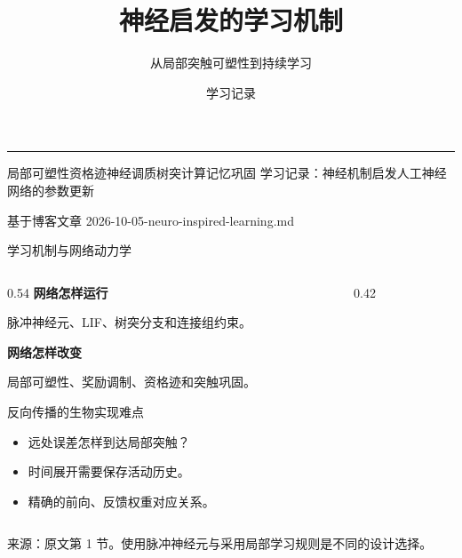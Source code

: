 \documentclass[UTF8,aspectratio=169,10pt,fontset=fandol]{ctexbeamer}
\title{神经启发的学习机制}
\subtitle{从局部突触可塑性到持续学习}
\author{学习记录}
\date{}
\newcommand{\source}[1]{\par\vfill{\tiny\color{Muted}来源：#1}}
\begin{document}
\begin{frame}[plain]
  \vspace{0.8cm}
  {\color{Coral}\rule{1.1cm}{3pt}}\par
  {\inserttitle\par}
  \vspace{0.4cm}
  {\large\insertsubtitle\par}
  \vspace{1cm}
  {\color{Blue}局部可塑性\quad 资格迹\quad 神经调质\quad 树突计算\quad 记忆巩固}
  \vfill
  {\small 学习记录：神经机制启发人工神经网络的参数更新}\par
  {\scriptsize\color{Muted}基于博客文章 2026-10-05-neuro-inspired-learning.md}
\end{frame}

\begin{frame}{学习机制与网络动力学}
  \begin{columns}[T,onlytextwidth]
    \begin{column}{0.54\textwidth}
      \textbf{网络怎样运行}\par
      脉冲神经元、LIF、树突分支和连接组约束。
      \medskip

      \textbf{网络怎样改变}\par
      局部可塑性、奖励调制、资格迹和突触巩固。
      \medskip

      \alert{反向传播的生物实现难点}
      \begin{itemize}
        \item 远处误差怎样到达局部突触？
        \item 时间展开需要保存活动历史。
        \item 精确的前向、反馈权重对应关系。
      \end{itemize}
    \end{column}
    \begin{column}{0.42\textwidth}
      \centering
    \end{column}
  \end{columns}
  \source{原文第 1 节。使用脉冲神经元与采用局部学习规则是不同的设计选择。}
\end{frame}
\end{document}
